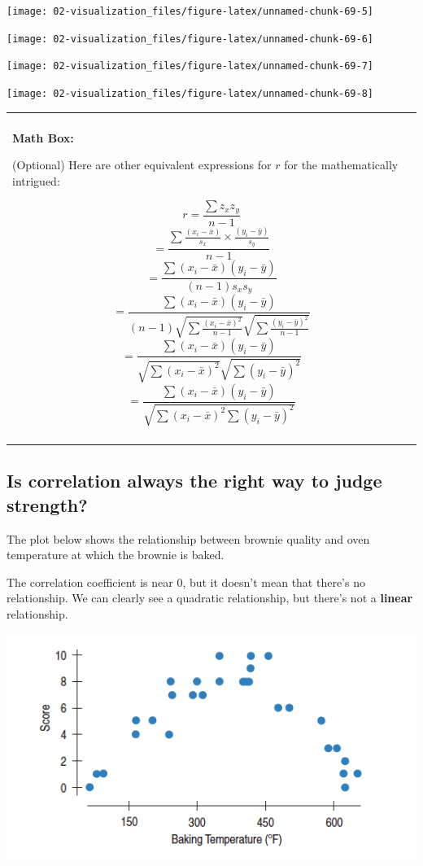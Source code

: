 \documentclass[
]{book}
\newenvironment{mathbox}
{
    \begin{center}
    
    \begin{tabular}{|p{0.8\textwidth}|}
    \rowcolor{LightYellow}
    \hline\\
    \rowcolor{LightYellow}
    \textbf{Math Box:}
}
{
    \\\rowcolor{LightYellow}
    \\\hline
    \end{tabular} 
    \end{center}
}
\begin{document}
\begin{center}\texttt{[image: 02-visualization\_files/figure-latex/unnamed-chunk-69-5]} \end{center}

\begin{center}\texttt{[image: 02-visualization\_files/figure-latex/unnamed-chunk-69-6]} \end{center}

\begin{center}\texttt{[image: 02-visualization\_files/figure-latex/unnamed-chunk-69-7]} \end{center}

\begin{center}\texttt{[image: 02-visualization\_files/figure-latex/unnamed-chunk-69-8]} \end{center}

\begin{mathbox}
(Optional) Here are other equivalent expressions for \(r\) for the
mathematically intrigued:

\[ r = \frac{\sum z_x z_y}{n-1}  \]
\[ = \frac{\sum{\frac{(x_i-\bar{x})}{s_x}\times\frac{(y_i-\bar{y})}{s_y}}}{n-1}\]
\[= \frac{\sum{(x_i-\bar{x})(y_i-\bar{y})}}{(n-1) s_x s_y}\]
\[= \frac{\sum{(x_i-\bar{x})(y_i-\bar{y})}}{(n-1)\sqrt{\sum{\frac{(x_i-\bar{x})^2}{n-1}}}\sqrt{\sum{\frac{(y_i-\bar{y})^2}{n-1}}}}\]
\[=\frac{\sum{(x_i-\bar{x})(y_i-\bar{y})}}{\sqrt{\sum{(x_i-\bar{x})^2}}\sqrt{\sum{(y_i-\bar{y})^2}}}\]
\[=\frac{\sum{(x_i-\bar{x})(y_i-\bar{y})}}{\sqrt{\sum{(x_i-\bar{x})^2\sum{(y_i-\bar{y})^2}}}}\]
\end{mathbox}

\hypertarget{is-correlation-always-the-right-way-to-judge-strength}{%
\subsection{Is correlation always the right way to judge strength?}\label{is-correlation-always-the-right-way-to-judge-strength}}

The plot below shows the relationship between brownie quality and oven temperature at which the brownie is baked.

The correlation coefficient is near 0, but it doesn't mean that there's no relationship. We can clearly see a quadratic relationship, but there's not a \textbf{linear} relationship.

\includegraphics{Photos/Brownies.png}
\end{document}
